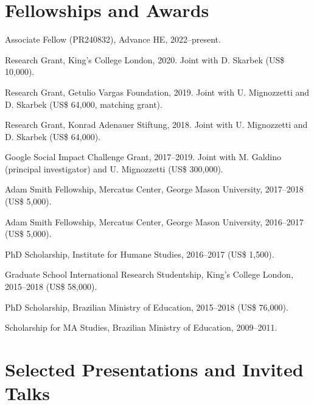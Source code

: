 \documentclass[a4paper]{article}
\renewenvironment{itemize}{
	\begin{list}{}{
			\setlength{\leftmargin}{1.5em}
		}
		}{
	\end{list}
}
\begin{document}
\section*{Fellowships and Awards}

\begin{itemize}
\item Associate Fellow (PR240832), Advance HE, 2022--present.
\item Research Grant, King's College London, 2020. Joint with D. Skarbek (US\$ 10,000).
\item Research Grant, Getulio Vargas Foundation, 2019. Joint with U. Mignozzetti and D. Skarbek (US\$ 64,000, matching grant).
\item Research Grant, Konrad Adenauer Stiftung, 2018. Joint with U. Mignozzetti and D. Skarbek (US\$ 64,000).
\item Google Social Impact Challenge Grant, 2017--2019. Joint with M. Galdino (principal investigator) and U. Mignozzetti (US\$ 300,000).
\item Adam Smith Fellowship, Mercatus Center, George Mason University, 2017--2018 (US\$ 5,000).
\item Adam Smith Fellowship, Mercatus Center, George Mason University, 2016--2017 (US\$ 5,000).
\item PhD Scholarship, Institute for Humane Studies, 2016--2017 (US\$ 1,500).
\item Graduate School International Research Studentship, King's College London, 2015--2018 (US\$ 58,000).
\item PhD Scholarship, Brazilian Ministry of Education, 2015--2018 (US\$ 76,000).
\item Scholarship for MA Studies, Brazilian Ministry of Education, 2009--2011.
\end{itemize}

\section*{Selected Presentations and Invited Talks}
\end{document}
